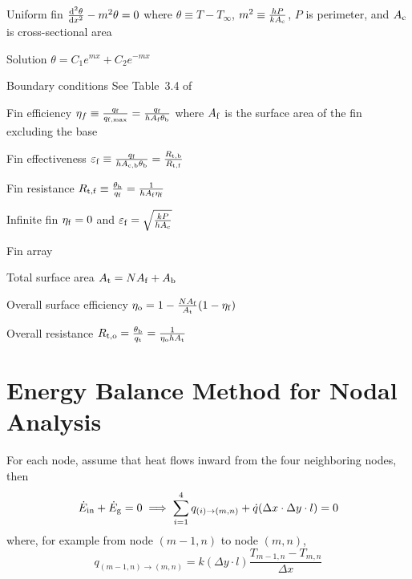 \documentclass{article}
\begin{document}
\begin{description*}
\item[Uniform fin]
  \(\od[2]{\theta}{x} - m^2\theta = 0\) where
  \(\theta \equiv T-T_\infty\),
  \(m^2 \equiv \frac{hP}{kA_{\mathrm{c}}}\),
  $P$ is perimeter, and
  $A_{\mathrm{c}}$ is cross-sectional area
  \begin{description*}
  \item[Solution]
    \(\theta = C_1e^{mx} + C_2e^{-mx}\)
  \item[Boundary conditions] See Table~3.4 of~\cite{hamt}
  \end{description*}
\item[Fin efficiency]
  \(\eta_f \equiv \frac{q_{\mathrm{f}}}{q_{\mathrm{f,max}}}
  = \frac{q_{\mathrm{f}}}{hA_{\mathrm{f}}\theta_{\mathrm{b}}}\)
  where $A_{\mathrm{f}}$ is the surface area of the fin excluding the base
\item[Fin effectiveness]
  \(\varepsilon_{\mathrm{f}} \equiv \frac{q_{\mathrm{f}}}{hA_{\mathrm{c,b}}\theta_{\mathrm{b}}}
  = \frac{R_{\mathrm{t,b}}}{R_{\mathrm{t,f}}}\)
\item[Fin resistance]
  \(R_{\mathrm{t,f}} \equiv \frac{\theta_{\mathrm{b}}}{q_{\mathrm{f}}}
  = \frac{1}{hA_{\mathrm{f}}\eta_{\mathrm{f}}}\)
\item[Infinite fin]
  \(\eta_{\mathrm{f}} = 0\) and
  \(\varepsilon_{\mathrm{f}} = \sqrt{\frac{kP}{hA_{\mathrm{c}}}}\)
\item[Fin array]~
  \begin{description*}
  \item[Total surface area]
    \(A_{\mathrm{t}} = NA_{\mathrm{f}} + A_{\mathrm{b}}\)
  \item[Overall surface efficiency]
    \(\eta_{\mathrm{o}} = 1 - \frac{NA_{\mathrm{f}}}{A_{\mathrm{t}}}(1-\eta_{\mathrm{f}})\)
  \item[Overall resistance]
    \(R_{\mathrm{t,o}} = \frac{\theta_{\mathrm{b}}}{q_{\mathrm{t}}}
    = \frac{1}{\eta_{\mathrm{o}}hA_{\mathrm{t}}}\)
  \end{description*}
\end{description*}

\section{Energy Balance Method for Nodal Analysis}

For each node, assume that heat flows inward from the four neighboring nodes, then
\[\dot{E}_{\mathrm{in}} + \dot{E}_{\mathrm{g}} = 0
\implies \sum_{i=1}^4q_{(i)\rightarrow(m,n)} + \dot{q}(\Delta{}x\cdot\Delta{}y\cdot{}l) = 0\]
where, for example from node $(m-1,n)$ to node $(m,n)$,
\[q_{(m-1,n)\rightarrow(m,n)} = k(\Delta{}y\cdot{}l)\frac{T_{m-1,n}-T_{m,n}}{\Delta{}x}\]
\end{document}
